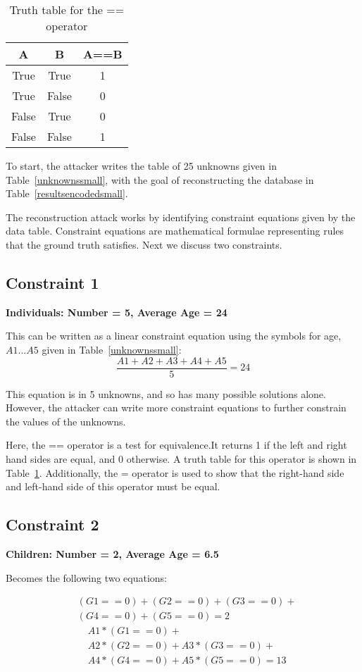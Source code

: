 \documentclass[5p,times,11pt]{elsarticle}
\begin{document}
\begin{table}[t]
\begin{tabular}{cc|c}
A & B & A==B  \\
\hline
True & True & 1   \\
True & False & 0  \\
False & True & 0  \\
False & False & 1  \\
\hline
\end{tabular}
\caption{Truth table for the == operator}\label{truthtable}
\end{table}


 To start, the attacker writes the table of 25 unknowns given in Table~\ref{unknownssmall}, with the goal of reconstructing the database in Table~\ref{resultsencodedsmall}.



The reconstruction attack works by identifying constraint
equations given by the data table. Constraint equations are  mathematical formulae representing rules that the ground truth satisfies. Next we discuss two constraints.
\subsection{Constraint 1}
\textbf{Individuals: Number = 5, Average Age = 24}


This can be written as a linear constraint equation using the symbols for age, $A1...A5$ given in Table~\ref{unknownssmall}:
\[\frac{A1 + A2 + A3 + A4 + A5}{5} = 24\]

This equation is in 5 unknowns, and so has many possible solutions alone.
However, the attacker can write more constraint equations to further constrain the values of the unknowns.

Here, the == operator is a test for equivalence.It returns 1 if the left and right hand sides are equal, and 0 otherwise. A truth table for this operator is shown in Table~\ref{truthtable}. Additionally, the = operator is used to show that the right-hand side and left-hand side of this operator must be equal.

\subsection{Constraint 2}
\textbf{Children: Number = 2, Average Age = 6.5}


Becomes the following two equations:

\begin{align*}
& (G1==0) + (G2==0) + (G3==0)+\\
& (G4==0)+  (G5==0) = 2
\end{align*}
\begin{align*}
&  A1 * (G1==0) + \\
&  A2 * (G2==0) + A3 * (G3==0) +\\
&  A4 * (G4==0) + A5 * (G5==0) = 13
\end{align*}
\end{document}
